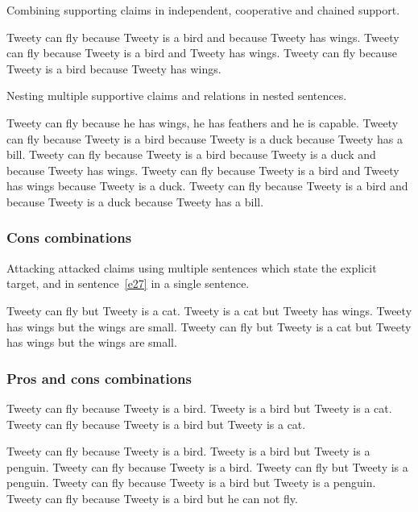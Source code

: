 \noindent Combining supporting claims in independent, cooperative and chained support.
\begin{exe}
\ex\label{e18} Tweety can fly because Tweety is a bird and because Tweety has wings.
\ex\label{e19} Tweety can fly because Tweety is a bird and Tweety has wings.
\ex\label{e20} Tweety can fly because Tweety is a bird because Tweety has wings.
\end{exe}

\noindent Nesting multiple supportive claims and relations in nested sentences.
\begin{exe}
\ex\label{e21} Tweety can fly because he has wings, he has feathers and he is capable.
\ex\label{e22} Tweety can fly because Tweety is a bird because Tweety is a duck because Tweety has a bill.
\ex\label{e23} Tweety can fly because Tweety is a bird because Tweety is a duck and because Tweety has wings.
\ex\label{e24} Tweety can fly because Tweety is a bird and Tweety has wings because Tweety is a duck.
\ex\label{e25} Tweety can fly because Tweety is a bird and because Tweety is a duck because Tweety has a bill.
\end{exe}

\subsubsection{Cons combinations}
Attacking attacked claims using multiple sentences which state the explicit target, and in sentence~\ref{e27} in a single sentence. 
\begin{exe}
\ex\label{e26} Tweety can fly but Tweety is a cat. Tweety is a cat but Tweety has wings. Tweety has wings but the wings are small.
\ex\label{e27} Tweety can fly but Tweety is a cat but Tweety has wings but the wings are small.
\end{exe}

\subsubsection{Pros and cons combinations}
\begin{exe}
\ex\label{e28} Tweety can fly because Tweety is a bird. Tweety is a bird but Tweety is a cat.
\ex\label{e29} Tweety can fly because Tweety is a bird but Tweety is a cat.
\end{exe}

\begin{exe}
\ex\label{e30} Tweety can fly because Tweety is a bird. Tweety is a bird but Tweety is a penguin.
\ex\label{e31} Tweety can fly because Tweety is a bird. Tweety can fly but Tweety is a penguin.
\ex\label{e32} Tweety can fly because Tweety is a bird but Tweety is a penguin.
\ex\label{e33} Tweety can fly because Tweety is a bird but he can not fly.
\end{exe}

